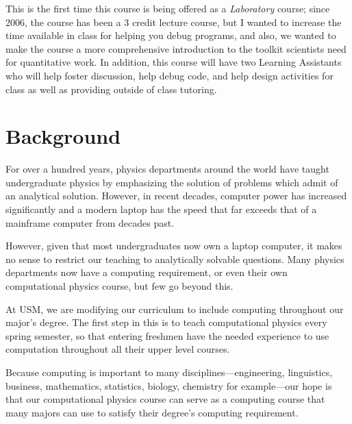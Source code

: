 \documentclass[justified]{tufte-handout}
\begin{document}
This is the first time this course is being offered as a \textit{Laboratory} course; since 2006, the course has been a 
3 credit lecture course, but I wanted to increase the time available in class for helping you debug programs, and also, we wanted to make the course a more comprehensive introduction to the toolkit scientists need for quantitative work. 
In addition, this course will have two Learning Assistants who will help foster discussion, help debug code, and help design activities for class as well as providing outside of  class tutoring. 

\section*{Background}

For over a hundred years, physics departments around the world have taught undergraduate physics by emphasizing the solution of problems which admit of an analytical solution.
 However, in recent decades, computer power has increased significantly and a modern laptop has the speed that far exceeds that of a mainframe computer from decades past.

However, given that most undergraduates now own a laptop computer, it makes no sense to restrict our teaching to analytically solvable questions.
Many physics departments now have a computing requirement, or even their own computational physics course, but few go beyond this.

At USM, we are modifying our curriculum to include computing throughout our major's degree. The first step in this is to teach computational physics every spring semester, so that entering freshmen have the needed experience to use computation throughout all their upper level courses.

Because computing is important to many disciplines—engineering, linguistics, business, mathematics, statistics, biology, chemistry for example—our hope is that our computational physics course can serve as a computing course that many majors can use to satisfy their degree's computing requirement.
\end{document}
